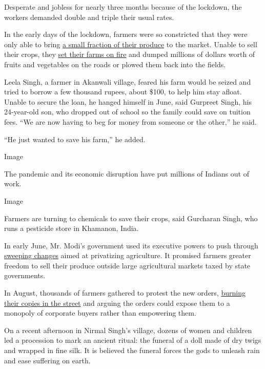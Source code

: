 Desperate and jobless for nearly three months because of the lockdown,
the workers demanded double and triple their usual rates.

In the early days of the lockdown, farmers were so constricted that they
were only able to bring
\href{https://coronapolicyimpact.org/wp-content/uploads/2020/04/sserwp2001-2.pdf}{a
small fraction of their produce} to the market. Unable to sell their
crops, they
\href{https://www.ndtv.com/india-news/coronavirus-no-mill-amid-lockdown-punjab-farmer-burns-sugarcane-worth-rs-5-lakh-2255613}{set
their farms on fire} and dumped millions of dollars worth of fruits and
vegetables on the roads or plowed them back into the fields.

Leela Singh, a farmer in Akanwali village, feared his farm would be
seized and tried to borrow a few thousand rupees, about \$100, to help
him stay afloat. Unable to secure the loan, he hanged himself in June,
said Gurpreet Singh, his 24-year-old son, who dropped out of school so
the family could save on tuition fees. ``We are now having to beg for
money from someone or the other,'' he said.

``He just wanted to save his farm,'' he added.

Image

The pandemic and its economic disruption have put millions of Indians
out of work.

Image

Farmers are turning to chemicals to save their crops, said Gurcharan
Singh, who runs a pesticide store in Khamanon, India.

In early June, Mr. Modi's government used its executive powers to push
through
\href{https://pib.gov.in/PressReleasePage.aspx?PRID=1629033}{sweeping
changes} aimed at privatizing agriculture. It promised farmers greater
freedom to sell their produce outside large agricultural markets taxed
by state governments.

In August, thousands of farmers gathered to protest the new orders,
\href{https://twitter.com/ramanmann1974/status/1294625753363910657?s=20}{burning
their copies in the street} and arguing the orders could expose them to
a monopoly of corporate buyers rather than empowering them.

On a recent afternoon in Nirmal Singh's village, dozens of women and
children led a procession to mark an ancient ritual: the funeral of a
doll made of dry twigs and wrapped in fine silk. It is believed the
funeral forces the gods to unleash rain and ease suffering on earth.

